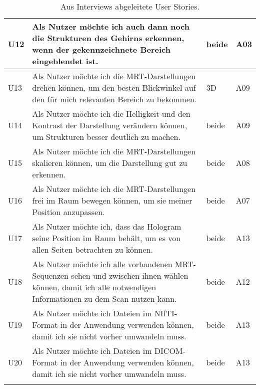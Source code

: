\begin{longtable} {p{}p{}p{}p{}}
\midrule
U12 & Als Nutzer möchte ich auch dann noch die Strukturen des Gehirns erkennen, wenn der gekennzeichnete Bereich eingeblendet ist. & beide & A03\\
\midrule 
U13 & Als Nutzer möchte ich die MRT-Darstellungen drehen können, um den besten Blickwinkel auf den für mich relevanten Bereich zu bekommen. & 3D & A09\\
\midrule 
U14 & Als Nutzer möchte ich die Helligkeit und den Kontrast der Darstellung verändern können, um Strukturen besser deutlich zu machen. & beide & A09\\
\midrule 
U15 & Als Nutzer möchte ich die MRT-Darstellungen skalieren können, um die Darstellung gut zu erkennen. & beide & A08\\
\midrule 
U16 & Als Nutzer möchte ich die MRT-Darstellungen frei im Raum bewegen können, um sie meiner Position anzupassen. & beide & A07\\
\midrule 
U17 & Als Nutzer möchte ich, dass das Hologram seine Position im Raum behält, um es von allen Seiten betrachten zu können. & beide & A13\\
\midrule 
U18 & Als Nutzer möchte ich alle vorhandenen MRT-Sequenzen sehen und zwischen ihnen wählen können, damit ich alle notwendigen Informationen zu dem Scan nutzen kann. & beide & A12\\
\midrule 
U19 & Als Nutzer möchte ich Dateien im NIfTI-Format in der Anwendung verwenden können, damit ich sie nicht vorher umwandeln muss. & beide & A13\\
\midrule 
U20 & Als Nutzer möchte ich Dateien im DICOM-Format in der Anwendung verwenden können, damit ich sie nicht vorher umwandeln muss. & beide & A13\\

\bottomrule
\caption{\label{tab:userStories}Aus Interviews abgeleitete User Stories.}
\end{longtable}

